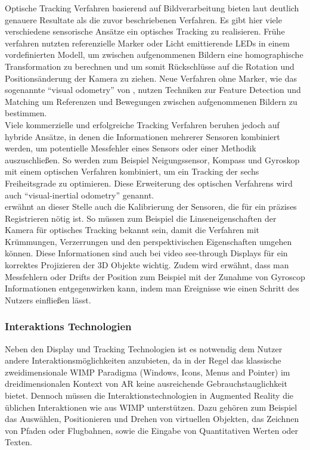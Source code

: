 Optische Tracking Verfahren basierend auf Bildverarbeitung bieten laut \citet{van2010survey} deutlich genauere Resultate als die zuvor beschriebenen Verfahren. Es gibt hier viele verschiedene sensorische Ansätze ein optisches Tracking zu realisieren. Frühe verfahren nutzten referenzielle Marker oder Licht emittierende LEDs in einem vordefinierten Modell, um zwischen aufgenommenen Bildern eine homographische Transformation zu berechnen und um somit Rückschlüsse auf die Rotation und Positionsänderung der Kamera zu ziehen. Neue Verfahren ohne Marker, wie das sogenannte \enquote{visual odometry} von \citet{nister2004visual}, nutzen Techniken zur Feature Detection und Matching um Referenzen und Bewegungen zwischen aufgenommenen Bildern zu bestimmen.\\

Viele kommerzielle und erfolgreiche Tracking Verfahren beruhen jedoch auf hybride Ansätze, in denen die Informationen mehrerer Sensoren kombiniert werden, um potentielle Messfehler eines Sensors oder einer Methodik auszuschließen. So werden zum Beispiel Neigungssensor, Kompass und Gyroskop mit einem optischen Verfahren kombiniert, um ein Tracking der sechs Freiheitsgrade zu optimieren. Diese Erweiterung des optischen Verfahrens wird auch \enquote{visual-inertial odometry} genannt. \citep{van2010survey}\\

\citet{azuma2001recent} erwähnt an dieser Stelle auch die Kalibrierung der Sensoren, die für ein präzises Registrieren nötig ist. So müssen zum Beispiel die Linseneigenschaften der Kamera für optisches Tracking bekannt sein, damit die Verfahren mit Krümmungen, Verzerrungen und den perspektivischen Eigenschaften umgehen können. Diese Informationen sind auch bei video see-through Displays für ein korrektes Projizieren der 3D Objekte wichtig. Zudem wird erwähnt, dass man Messfehlern oder Drifts der Position zum Beispiel mit der Zunahme von Gyroscop Informationen entgegenwirken kann, indem man Ereignisse wie einen Schritt des Nutzers einfließen lässt. \citep{azuma2001recent} \\

\subsubsection{Interaktions Technologien}

Neben den Display und Tracking Technologien ist es notwendig dem Nutzer andere Interaktionsmöglichkeiten anzubieten, da in der Regel das klassische zweidimensionale WIMP Paradigma (Windows, Icons, Menus and Pointer) im dreidimensionalen Kontext von AR keine ausreichende Gebrauchstauglichkeit bietet. Dennoch müssen die Interaktionstechnologien in Augmented Reality die üblichen Interaktionen wie aus WIMP unterstützen. Dazu gehören zum Beispiel das Auswählen, Positionieren und Drehen von virtuellen Objekten, das Zeichnen von Pfaden oder Flugbahnen, sowie die Eingabe von Quantitativen Werten oder Texten. \citep{van2010survey} \\

